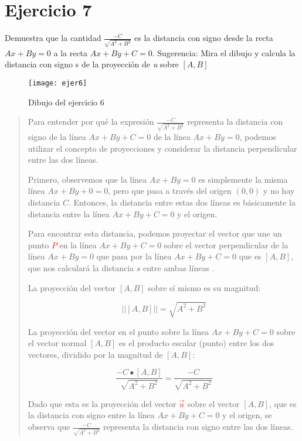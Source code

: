 \documentclass{article}
\begin{document}
 \section*{Ejercicio 7}
 Demuestra que la cantidad $\frac{-C}{\sqrt{A^2+B^2}}$
  es la distancia con signo desde
 la recta $Ax + By = 0$ a la recta $Ax + By + C = 0$.
 Sugerencia: Mira el dibujo y calcula la distancia con signo s de
 la proyección de \emph{u} sobre $[A, B]$
   \begin{figure}[h]
      \centering
      \texttt{[image: ejer6]}
      \caption{Dibujo del ejercicio 6}
      \label{fig:ejercicio6}
   \end{figure}
\begin{quote}
   Para entender por qué la expresión \(\frac{-C}{\sqrt{A^2 + B^2}}\) 
   representa la distancia con signo de la línea \(Ax + By + C = 0\) 
   de la línea \(Ax + By = 0\), podemos utilizar el concepto de proyecciones 
   y considerar la distancia perpendicular entre las dos líneas.
   
   Primero, observemos que la línea \(Ax + By = 0\)
    es simplemente la misma línea \(Ax + By + 0 = 0\), 
    pero que pasa a través del origen $(0,0)$ y no hay distancia $C$. 
    Entonces, la distancia entre estas dos líneas es básicamente 
    la distancia entre la línea \(Ax + By + C = 0\) y el origen.
   
   Para encontrar esta distancia, podemos proyectar el vector 
   que une un punto \textcolor{red}{$P$} en la línea \(Ax + By + C = 0\)  
   sobre el vector perpendicular de la línea \(Ax + By = 0\) que pasa
   por la línea  \(Ax + By + C = 0 \) que es \([A, B]\), que nos calculará la 
   distancia \textcolor{green}{$s$} entre ambas líneas .
   
   La proyección del vector \([A, B]\) sobre sí mismo es su magnitud:
   
   \[||[A, B]|| = \sqrt{A^2 + B^2}\]
   
   La proyección del vector en el punto sobre la línea \(Ax + By + C = 0\) 
   sobre el vector normal \([A, B]\) es el producto escalar (punto) 
   entre los dos vectores, dividido por la magnitud de \([A, B]\):
   
   \[\frac{-C \bullet [A, B]}{\sqrt{A^2 + B^2}} = \frac{-C}{\sqrt{A^2 + B^2}}\]
   
   Dado que esta es la proyección del vector \textcolor{red}{$\vec{u}$} 
   sobre el vector \([A, B]\), 
   que es la distancia con signo entre la línea \(Ax + By + C = 0\)
    y el origen, se observa que \(\frac{-C}{\sqrt{A^2 + B^2}}\) 
    representa la distancia con signo entre las dos líneas.


\end{quote}
\end{document}
